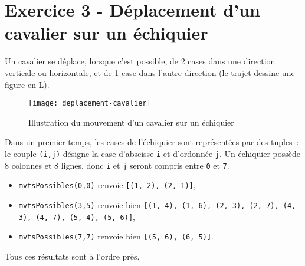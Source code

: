 \vspace{-0.5cm}
\section*{Exercice 3 - Déplacement d'un cavalier sur un échiquier}


Un cavalier se déplace, lorsque c'est possible, de 2 cases dans une direction verticale ou horizontale, et de 1 case dans l'autre direction (le trajet dessine une figure en L).

\begin{figure}[h]
	\begin{center}
		\texttt{[image: deplacement-cavalier]}
	\end{center}
	\caption{Illustration du mouvement d'un cavalier sur un échiquier}
\end{figure}

Dans un premier temps, les cases de l'échiquier sont représentées par des tuples~: le couple \texttt{(i,j)} désigne la case d'abscisse \texttt{i} et d'ordonnée \texttt{j}. Un échiquier possède 8 colonnes et 8 lignes, donc \texttt{i} et \texttt{j} seront compris entre \texttt{0} et \texttt{7}.



{}
\vspace{-.5cm}
\begin{itemize}
	\item \texttt{mvtsPossibles(0,0)} renvoie \texttt{[(1, 2), (2, 1)]},
	\item \texttt{mvtsPossibles(3,5)} renvoie bien \texttt{[(1, 4), (1, 6), (2, 3), (2, 7), (4, 3), (4, 7), (5, 4), (5, 6)]},
	\item \texttt{mvtsPossibles(7,7)} renvoie bien \texttt{[(5, 6), (6, 5)]}.
\end{itemize}

Tous ces résultats sont à l'ordre près. 



